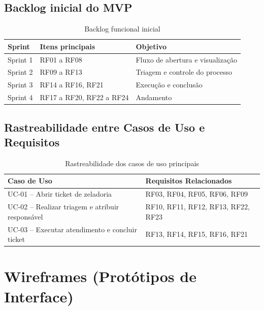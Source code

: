 \documentclass[12pt,a4paper]{article}
\begin{document}
\subsection{Backlog inicial do MVP}

\begin{table}[H]
\centering
\begin{tabular}{|>{\raggedright\arraybackslash}p{2.0cm}|>{\raggedright\arraybackslash}p{9.4cm}|>{\raggedright\arraybackslash}p{3.0cm}|}
\hline
\textbf{Sprint} & \textbf{Itens principais} & \textbf{Objetivo} \\ \hline
Sprint 1 & RF01 a RF08 & Fluxo de abertura e visualização \\ \hline
Sprint 2 & RF09 a RF13 & Triagem e controle do processo \\ \hline
Sprint 3 & RF14 a RF16, RF21 & Execução e conclusão \\ \hline
Sprint 4 & RF17 a RF20, RF22 a RF24 & Andamento \\ \hline
\end{tabular}
\caption{Backlog funcional inicial}
\end{table}

\subsection{Rastreabilidade entre Casos de Uso e Requisitos}

\begin{table}[H]
\centering
\begin{tabular}{|>{\raggedright\arraybackslash}p{5.0cm}|>{\raggedright\arraybackslash}p{8.8cm}|}
\hline
\textbf{Caso de Uso} & \textbf{Requisitos Relacionados} \\ \hline
UC-01 -- Abrir ticket de zeladoria & RF03, RF04, RF05, RF06, RF09 \\ \hline
UC-02 -- Realizar triagem e atribuir responsável & RF10, RF11, RF12, RF13, RF22, RF23 \\ \hline
UC-03 -- Executar atendimento e concluir ticket & RF13, RF14, RF15, RF16, RF21 \\ \hline
\end{tabular}
\caption{Rastreabilidade dos casos de uso principais}
\end{table}

\section{Wireframes (Protótipos de Interface)}
\end{document}
